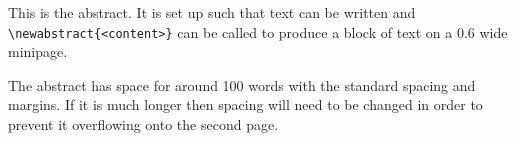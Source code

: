 
This is the abstract. It is set up such that text can be written and \texttt{\textbackslash newabstract\{<content>\}} can be called to produce a block of text on a 0.6 wide minipage.

The abstract has space for around 100 words with the standard spacing and margins. If it is much longer then spacing will need to be changed in order to prevent it overflowing onto the second page.